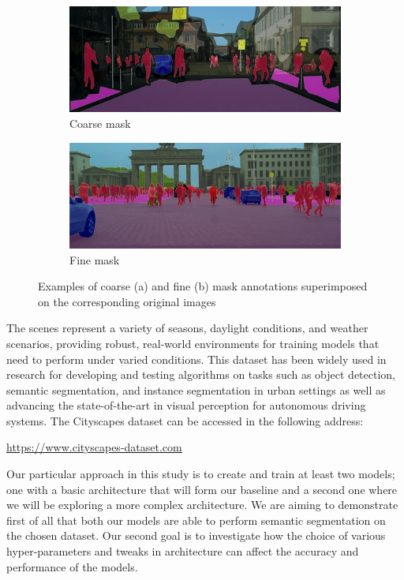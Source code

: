 \documentclass[a4paper,11pt]{article}
\begin{document}
\begin{figure}[ht]
    \centering
    \begin{subfigure}{0.45\textwidth}
        \centering
        \includegraphics[width=\linewidth]{coarse_example.jpg}
        \caption{Coarse mask}
        \label{fig:sub1}
    \end{subfigure}\hfill
    \begin{subfigure}{0.45\textwidth}
        \centering
        \includegraphics[width=\linewidth]{fine_example.jpg}
        \caption{Fine mask}
        \label{fig:sub2}
    \end{subfigure}
    \caption{Examples of coarse (a) and fine (b) mask annotations superimposed on the corresponding original images}
    \label{fig:cityscapes}
\end{figure}

The scenes represent a variety of seasons, daylight conditions, and weather scenarios, providing robust, real-world environments for training models that need to perform under varied conditions. This dataset has been widely used in research for developing and testing algorithms on tasks such as object detection, semantic segmentation, and instance segmentation in urban settings as well as advancing the state-of-the-art in visual perception for autonomous driving systems. The Cityscapes dataset can be accessed in the following address:
\begin{center}
\url{https://www.cityscapes-dataset.com}
\end{center}
Our particular approach in this study is to create and train at least two models; one with a basic architecture that will form our baseline and a second one where we will be exploring a more complex architecture. We are aiming to demonstrate first of all that both our models are able to perform semantic segmentation on the chosen dataset. Our second goal is to investigate how the choice of various hyper-parameters and tweaks in architecture can affect the accuracy and performance of the models. 
\end{document}
